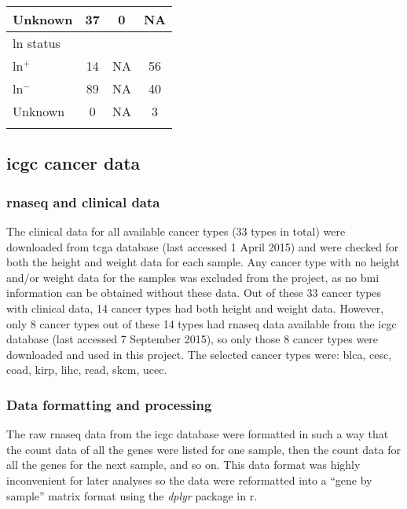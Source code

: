 \begin{ThreePartTable}
\begin{longtable}{lccc}
		\hspace{1em} Unknown                 & 37 & 0 & NA \\
		\hline
		\rule{0pt}{2.25ex}\gls{ln} status   \\
		\hspace{1em} \gls{ln}$^+$            & 14 & NA & 56\\
		\hspace{1em} \gls{ln}$^-$            & 89 & NA & 40\\
		\hspace{1em} Unknown                 & 0  & NA & 3 \\
		\hline
		\hline
		\insertTableNotes
	\end{longtable}
\end{ThreePartTable}

\subsection{\gls{icgc} cancer data}
\label{sub:icgc_cancer_data}

\subsubsection{\gls{rnaseq} and clinical data}
\label{ssub:rnaseq_and_clinical_data}

The clinical data for all available cancer types (33 types in total) were downloaded from \gls{tcga} database (last accessed 1 April 2015) and were checked for both the height and weight data for each sample.
Any cancer type with no height and/or weight data for the samples was excluded from the project, as no \gls{bmi} information can be obtained without these data.
Out of these 33 cancer types with clinical data, 14 cancer types had both height and weight data.
However, only 8 cancer types out of these 14 types had \gls{rnaseq} data available from the \gls{icgc} database (last accessed 7 September 2015), so only those 8 cancer types were downloaded and used in this project.
The selected cancer types were: \gls{blca}, \gls{cesc}, \gls{coad}, \gls{kirp}, \gls{lihc}, \gls{read}, \gls{skcm}, \gls{ucec}.

\subsubsection{Data formatting and processing}
\label{ssub:data_formatting_and_processing}

The raw \gls{rnaseq} data from the \gls{icgc} database were formatted in such a way that the count data of all the genes were listed for one sample, then the count data for all the genes for the next sample, and so on.
This data format was highly inconvenient for later analyses so the data were reformatted into a ``gene by sample'' matrix format using the \textit{dplyr} package in \gls{r}.

